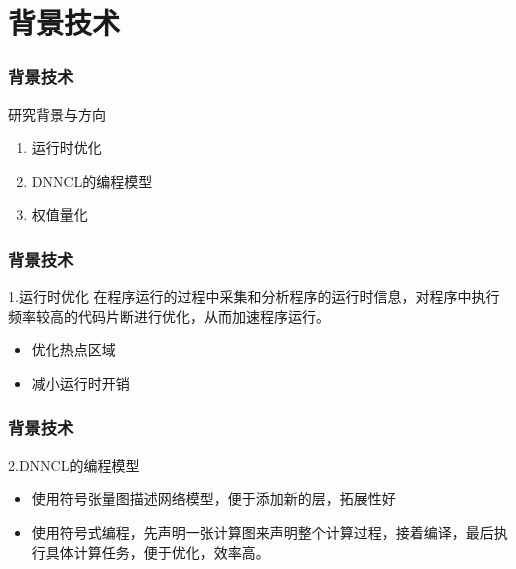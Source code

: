 \documentclass[12pt]{ctexbeamer}
\begin{document}
\section{背景技术}
\begin{frame}
  \frametitle{背景技术}
  \begin{block}{研究背景与方向}
  \begin{enumerate}
    \item 运行时优化
    \item DNNCL的编程模型
    \item 权值量化
  \end{enumerate}
  \end{block}
\end{frame}

\begin{frame}
  \frametitle{背景技术}
  \begin{block}{1.运行时优化}
     在程序运行的过程中采集和分析程序的运行时信息，对程序中执行频率较高的代码片断进行优化，从而加速程序运行。
    \begin{itemize}
    \item 优化热点区域
    \item 减小运行时开销
    \end{itemize}
  \end{block}
\end{frame}

\begin{frame}
  \frametitle{背景技术}
  \begin{block}{2.DNNCL的编程模型}
    \begin{itemize}
    \item 使用符号张量图描述网络模型，便于添加新的层，拓展性好
    \item 使用符号式编程，先声明一张计算图来声明整个计算过程，接着编译，最后执行具体计算任务，便于优化，效率高。
    \end{itemize}
  \end{block}
\end{frame}
\end{document}
